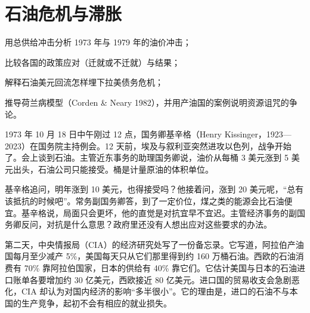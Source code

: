\chapter{石油危机与滞胀}\label{ch:oil}

\begin{chapterguide}
\begin{guidegoals}
\item 用总供给冲击分析 1973 年与 1979 年的油价冲击；
\item 比较各国的政策应对（迁就或不迁就）与结果；
\item 解释石油美元回流怎样埋下拉美债务危机；
\item 推导荷兰病模型（Corden \& Neary 1982），并用产油国的案例说明资源诅咒的争论。
\end{guidegoals}
\end{chapterguide}

1973 年 10 月 18 日中午刚过 12 点，国务卿基辛格（Henry Kissinger，1923—2023）在国务院主持例会\cite{frus47,loc47}。12 天前，埃及与叙利亚突然进攻以色列，战争开始了\cite{frus47}。会上谈到石油。主管近东事务的助理国务卿说，油价从每桶 3 美元涨到 5 美元出头，石油公司只能接受\cite{frus47}。桶是计量原油的体积单位。

基辛格追问，明年涨到 10 美元，也得接受吗？他接着问，涨到 20 美元呢，“总有该抵抗的时候吧”\cite{frus47}。常务副国务卿答，到了一定价位，煤之类的能源会比石油便宜\cite{frus47}。基辛格说，局面只会更坏，他的直觉是对抗宜早不宜迟\cite{frus47}。主管经济事务的副国务卿反问，对抗是什么意思？政府里还没有人想出应对这些要求的办法\cite{frus47}。

第二天，中央情报局（CIA）的经济研究处写了一份备忘录\cite{frus47}。它写道，阿拉伯产油国每月至少减产 5\%，美国每天只从它们那里得到约 160 万桶石油\cite{frus47}。西欧的石油消费有 70\% 靠阿拉伯国家，日本的供给有 40\% 靠它们\cite{frus47}。它估计美国与日本的石油进口账单各要增加约 30 亿美元，西欧接近 80 亿美元\cite{frus47}。进口国的贸易收支会急剧恶化，CIA 却认为对国内经济的影响“多半很小”\cite{frus47}。它的理由是，进口的石油不与本国的生产竞争，起初不会有相应的就业损失\cite{frus47}。

